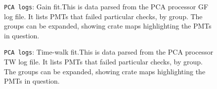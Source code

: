 \documentclass[12pt]{article}
\begin{document}
\begin{figure}
\centering
\noindent{}
  \caption{\centering \texttt{PCA logs}: Gain fit.\hspace{\textwidth}This is data parsed from the PCA processor GF log file. It lists PMTs that failed particular checks, by group. The groups can be expanded, showing crate maps highlighting the PMTs in question.}
  \label{fig:log_gf}
\end{figure}

\begin{figure}
\centering
\noindent{}
  \caption{\centering \texttt{PCA logs}: Time-walk fit.\hspace{\textwidth}This is data parsed from the PCA processor TW log file. It lists PMTs that failed particular checks, by group. The groups can be expanded, showing crate maps highlighting the PMTs in question.}
  \label{fig:log_tw}
\end{figure}
\end{document}
